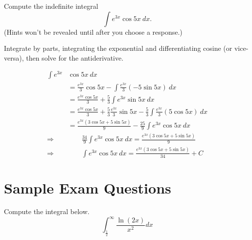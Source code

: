 \documentclass{ximera}
\begin{document}
\begin{question}%

Compute the indefinite integral 
\[\int e^{3x}  \cos 5x ~ dx.\]
(Hints won't be revealed until after you choose a response.)
\begin{multiplechoice}
\end{multiplechoice}
\begin{feedback}
Integrate by parts, integrating the exponential and differentiating cosine (or vice-versa), then solve for the antiderivative.
\begin{hint}
\[ \begin{aligned}
    \int e^{3x} & \cos 5x ~ dx \\
    & = \frac{e^{3x}}{3} \cos 5x - \int \frac{e^{3x}}{3} (-5 \sin 5x) ~ dx \\
    & = \frac{e^{3x} \cos 5x}{3} + \frac{5}{3} \int e^{3x} \sin 5x ~ dx \\
    & = \frac{e^{3x} \cos 5x}{3} + \frac{5}{3} \frac{e^{3x}}{3} \sin 5x - \frac{5}{3} \int \frac{e^{3x}}{3} (5 \cos 5x) ~ dx \\
    & = \frac{e^{3x} (3 \cos 5x + 5 \sin 5x)}{9} - \frac{25}{9} \int e^{3x} \cos 5x ~ dx  \\
    \Rightarrow   & \qquad \frac{34}{9}  \int e^{3x}  \cos 5x ~ dx  = \frac{e^{3x} (3 \cos 5x + 5 \sin 5x)}{9} \\
    \Rightarrow & \qquad  \int  e^{3x}  \cos 5x ~ dx = \frac{e^{3x} (3 \cos 5x + 5 \sin 5x)}{34} + C
\end{aligned}\]
\end{hint}
\end{feedback}

\end{question}

\section*{Sample Exam Questions}

\begin{question}%

Compute the integral below.
\[ \int_{\frac{1}{2}}^\infty \frac{ \ln (2x)}{x^2} dx \]
\begin{multiplechoice}
\end{multiplechoice}

\end{question}
\end{document}
